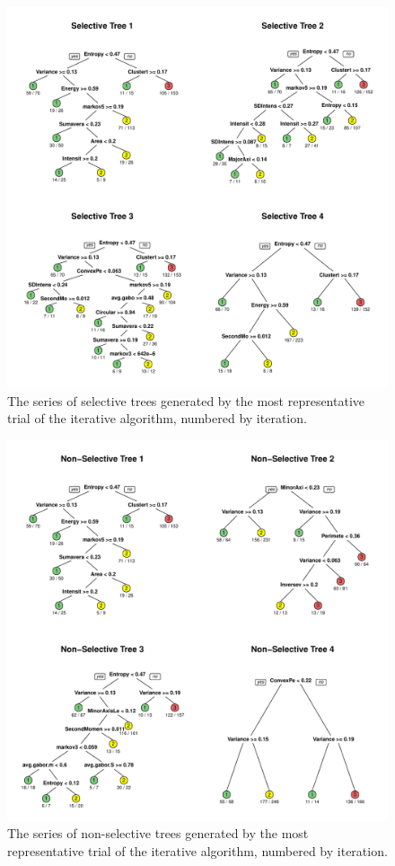 \documentclass[]{spie}
\begin{document}
   \begin{figure}[b]
   \begin{center}
   \includegraphics[width = \textwidth]{selectiveTrees.pdf}
   \end{center}
   \caption[Selective Trees]
   { \label{fig: select}
The series of selective trees generated by the most representative trial of the iterative algorithm, numbered by iteration.}
   \end{figure}
 \begin{figure}[h]
   \begin{center}
   \includegraphics[width = \textwidth]{nonselectiveTrees.pdf}
   \end{center}
   \caption[Non-Selective Trees]
   { \label{fig: nonselect}
The series of non-selective trees generated by the most representative trial of the iterative algorithm, numbered by iteration.}
   \end{figure}
\end{document}
